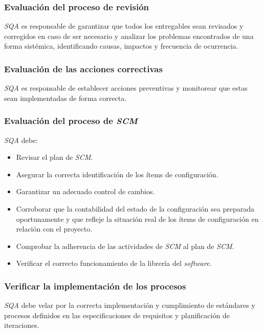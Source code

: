 \subsubsection{Evaluación del proceso de revisión}

\textit{SQA} es responsable de garantizar que todos los entregables sean revisados y corregidos en caso de ser necesario y analizar los problemas encontrados de una forma sistémica, identificando causas, impactos y frecuencia de ocurrencia.

\subsubsection{Evaluación de las acciones correctivas}

\textit{SQA} es responsable de establecer acciones preventivas y monitorear que estas sean implementadas de forma correcta. 

\subsubsection{Evaluación del proceso de \textit{SCM}}

\textit{SQA} debe:

\begin{itemize}
		\item 
		Revisar el plan de \textit{SCM}.
		\item 
		Asegurar la correcta identificación de los ítems de configuración.
		\item 
		Garantizar un adecuado control de cambios.
		\item 
		Corroborar que la contabilidad del estado de la configuración sea preparada oportunamente y que refleje la situación real de los ítems de configuración en relación con el proyecto.
		\item 
		Comprobar la adherencia de las actividades de \textit{SCM} al plan de \textit{SCM}.
		\item 
		Verificar el correcto funcionamiento de la librería del \textit{software}.
	\end{itemize}

\subsubsection{Verificar la implementación de los procesos}

\textit{SQA} debe velar por la correcta implementación y cumplimiento de estándares y procesos definidos en las especificaciones de requisitos y planificación de iteraciones.

